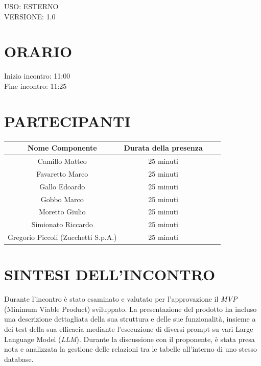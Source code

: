 \documentclass[5pt]{article}
\begin{document}
\begin{flushright}
    \begin{spacing}{1}
        USO: ESTERNO\\
        VERSIONE: 1.0\\
    \end{spacing}
\end{flushright}


\restoregeometry

\pagebreak


\section{ORARIO}
\begin{spacing}{1.5}
    {\large Inizio incontro: 11:00}\\
    {\large Fine incontro: 11:25} 
\end{spacing}

\section{PARTECIPANTI}
\setlength\cellspacetoplimit{6pt}
\setlength\cellspacebottomlimit{6pt}

\begin{table}[ht]
  \begin{tabular}{|Sc|Sc|}
    \hline
    \textbf{Nome Componente} & \textbf{Durata della presenza} \\
    \hline
    Camillo Matteo & 25 minuti \\
    Favaretto Marco & 25 minuti \\
    Gallo Edoardo & 25 minuti \\
    Gobbo Marco & 25 minuti \\
    Moretto Giulio & 25 minuti \\
    Simionato Riccardo & 25 minuti \\
    Gregorio Piccoli (Zucchetti S.p.A.) & 25 minuti \\
    \hline
  \end{tabular}
  \label{tab:conference}
\end{table}

\section{SINTESI DELL'INCONTRO}
Durante l'incontro è stato esaminato e valutato per l'approvazione il \textit{MVP} (Minimum Viable Product) sviluppato. La presentazione del prodotto ha incluso una descrizione dettagliata della sua struttura e delle sue funzionalità, insieme a dei test della sua efficacia  mediante l'esecuzione di diversi prompt su vari Large Language Model (\textit{LLM}).
Durante la discussione con il proponente, è stata presa nota e analizzata la gestione delle relazioni tra le tabelle all'interno di uno stesso database.
\end{document}
